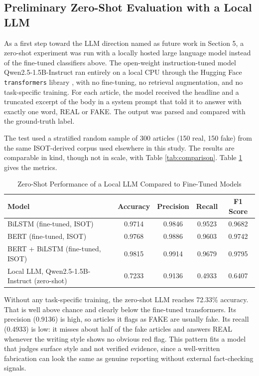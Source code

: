 \documentclass[runningheads]{llncs}
\begin{document}
\subsection{Preliminary Zero-Shot Evaluation with a Local LLM}

As a first step toward the LLM direction named as future work in Section 5, a zero-shot experiment was run with a locally hosted large language model instead of the fine-tuned classifiers above. The open-weight instruction-tuned model Qwen2.5-1.5B-Instruct \cite{Yang2024Qwen25} ran entirely on a local CPU through the Hugging Face \texttt{transformers} library \cite{Wolf2020Transformers}, with no fine-tuning, no retrieval augmentation, and no task-specific training. For each article, the model received the headline and a truncated excerpt of the body in a system prompt that told it to answer with exactly one word, REAL or FAKE. The output was parsed and compared with the ground-truth label.

The test used a stratified random sample of 300 articles (150 real, 150 fake) from the same ISOT-derived corpus \cite{ISOTDataset} used elsewhere in this study. The results are comparable in kind, though not in scale, with Table \ref{tab:comparison}. Table \ref{tab:llm-comparison} gives the metrics.

\begin{table}[H]
\centering
\caption{Zero-Shot Performance of a Local LLM Compared to Fine-Tuned Models}
\label{tab:llm-comparison}
\small
\begin{tabular}{|l|c|c|c|c|}
\hline
\textbf{Model} & \textbf{Accuracy} & \textbf{Precision} & \textbf{Recall} & \textbf{F1 Score} \\ \hline
BiLSTM (fine-tuned, ISOT) & 0.9714 & 0.9846 & 0.9523 & 0.9682 \\
BERT (fine-tuned, ISOT) & 0.9768 & 0.9886 & 0.9603 & 0.9742 \\
BERT + BiLSTM (fine-tuned, ISOT) & 0.9815 & 0.9914 & 0.9679 & 0.9795 \\
Local LLM, Qwen2.5-1.5B-Instruct (zero-shot) & 0.7233 & 0.9136 & 0.4933 & 0.6407 \\ \hline
\end{tabular}
\end{table}

Without any task-specific training, the zero-shot LLM reaches 72.33\% accuracy. That is well above chance and clearly below the fine-tuned transformers. Its precision (0.9136) is high, so articles it flags as FAKE are usually fake. Its recall (0.4933) is low: it misses about half of the fake articles and answers REAL whenever the writing style shows no obvious red flag. This pattern fits a model that judges surface style and not verified evidence, since a well-written fabrication can look the same as genuine reporting without external fact-checking signals.
\end{document}
